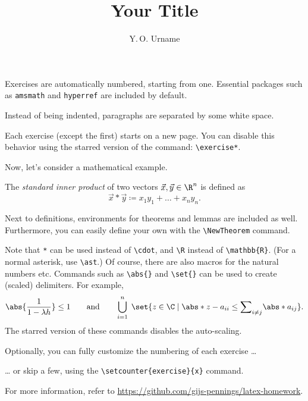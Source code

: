 \documentclass{homework}
\title{Your Title}
\author{Y.\,O. Urname}
\begin{document}
\maketitle

\exercise
Exercises are automatically numbered, starting from one. Essential packages such as \texttt{amsmath} and \texttt{hyperref} are included by default.

Instead of being indented, paragraphs are separated by some white space.

\exercise*
Each exercise (except the first) starts on a new page. You can disable this behavior using the starred version of the command: \verb|\exercise*|.

Now, let's consider a mathematical example.

\begin{definition}
    The \emph{standard inner product} of two vectors $\vec x, \vec y \in \R^n$ is defined as
    \[
        \vec x * \vec y \coloneqq x_1 y_1 + \dots + x_n y_n.
    \]
\end{definition}

Next to definitions, environments for theorems and lemmas are included as well. Furthermore, you can easily define your own with the \verb|\NewTheorem| command.

Note that \texttt{*} can be used instead of \verb|\cdot|, and \verb|\R| instead of \verb|\mathbb{R}|. (For a normal asterisk, use \verb|\ast|.) Of course, there are also macros for the natural numbers etc. Commands such as \verb|\abs{}| and \verb|\set{}| can be used to create (scaled) delimiters. For example,
\[
    \abs{\frac{1}{1 - \lambda h}} \le 1
    \qquad\text{and}\qquad
    \bigcup_{i=1}^n \; \set{z \in \C \mid \abs*{z - a_{ii}} \le {\sum\nolimits_{i \ne j}} \abs*{a_{ij}}}.
\]
The starred version of these commands disables the auto-scaling.

\exercise[Rec--2.1]
Optionally, you can fully customize the numbering of each exercise \dots

\setcounter{exercise}{7}
\exercise*
\dots{} or skip a few, using the \verb|\setcounter{exercise}{x}| command.

For more information, refer to \url{https://github.com/gijs-pennings/latex-homework}.
\end{document}
